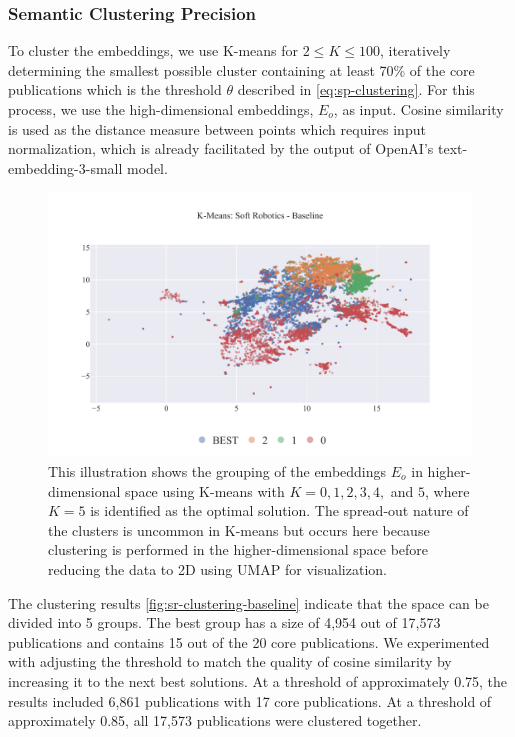 \subsubsection{Semantic Clustering Precision}

To cluster the embeddings, we use K-means for $2 \leq K \leq 100$, iteratively determining the smallest possible cluster containing at least 70\% of the core publications which is the threshold $\theta$ described in \autoref{eq:sp-clustering}. For this process, we use the high-dimensional embeddings, $E_o$, as input. Cosine similarity is used as the distance measure between points which requires input normalization, which is already facilitated by the output of OpenAI's text-embedding-3-small model.

\begin{figure}[!hb]
	\centering	
	\includegraphics[scale=0.6]{pics/sr-clustering-baseline.pdf}
	\caption[Semantic Clustering: Soft Robotics]{This illustration shows the grouping of the embeddings $E_o$ in higher-dimensional space using K-means with $K = 0, 1, 2, 3, 4,$ and $5$, where $K=5$ is identified as the optimal solution. The spread-out nature of the clusters is uncommon in K-means but occurs here because clustering is performed in the higher-dimensional space before reducing the data to 2D using UMAP for visualization.}\label{fig:sr-clustering-baseline}
\end{figure}

The clustering results \autoref{fig:sr-clustering-baseline} indicate that the space can be divided into 5 groups. The best group has a size of 4,954 out of 17,573 publications and contains 15 out of the 20 core publications. We experimented with adjusting the threshold to match the quality of cosine similarity by increasing it to the next best solutions. At a threshold of approximately 0.75, the results included 6,861 publications with 17 core publications. At a threshold of approximately 0.85, all 17,573 publications were clustered together.


